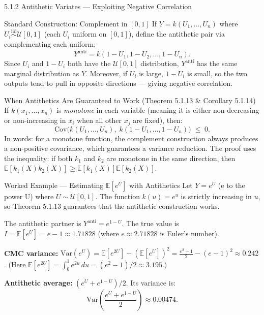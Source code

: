 \documentclass[aspectratio=169,10pt]{beamer}
\begin{document}
\begin{frame}[allowframebreaks]{5.1.2 Antithetic Variates --- Exploiting Negative Correlation}
\begin{block}{Standard Construction: Complement in $[0,1]$}
  If $Y = k(U_1, \ldots, U_n)$ where $U_i \overset{\mathrm{iid}}{\sim} \mathcal{U}[0,1]$
  (each $U_i$ uniform on $[0,1]$), define the antithetic pair via complementing
  each uniform:
  \[
    Y^{\mathrm{anti}} = k(1-U_1, 1-U_2, \ldots, 1-U_n).
  \]
  Since $U_i$ and $1-U_i$ both have the $\mathcal{U}[0,1]$ distribution,
  $Y^{\mathrm{anti}}$ has the same marginal distribution as $Y$.
  Moreover, if $U_i$ is large, $1-U_i$ is small, so the two outputs
  tend to pull in opposite directions --- giving negative correlation.
\end{block}

\framebreak

\begin{block}{When Antithetics Are Guaranteed to Work (Theorem 5.1.13 \& Corollary 5.1.14)}
  If $k(x_1, \ldots, x_n)$ is \emph{monotone} in each variable (meaning it is
  either non-decreasing or non-increasing in $x_i$ when all other $x_j$ are
  fixed), then:
  \[
    \mathrm{Cov}\bigl(k(U_1,\ldots,U_n),\; k(1-U_1,\ldots,1-U_n)\bigr) \;\le\; 0.
  \]
  In words: for a monotone function, the complement construction always
  produces a non-positive covariance, which guarantees a variance reduction.
  The proof uses the inequality: if both $k_1$ and $k_2$ are monotone in the
  same direction, then $\mathbb{E}[k_1(X)k_2(X)] \ge \mathbb{E}[k_1(X)]\mathbb{E}[k_2(X)]$.
\end{block}

\framebreak

\begin{exampleblock}{Worked Example --- Estimating $\mathbb{E}[e^U]$ with Antithetics}
  Let $Y = e^U$ (e to the power U) where $U \sim \mathcal{U}[0,1]$.
  The function $k(u) = e^u$ is strictly increasing in $u$, so Theorem 5.1.13
  guarantees that the antithetic construction works.

  The antithetic partner is $Y^{\mathrm{anti}} = e^{1-U}$.
  The true value is $I = \mathbb{E}[e^U] = e - 1 \approx 1.71828$
  (where $e \approx 2.71828$ is Euler's number).

  \medskip
  \textbf{CMC variance:}
  $\mathrm{Var}(e^U) = \mathbb{E}[e^{2U}] - (\mathbb{E}[e^U])^2
  = \tfrac{e^2-1}{2} - (e-1)^2 \approx 0.242$.
  (Here $\mathbb{E}[e^{2U}] = \int_0^1 e^{2u}\,du = (e^2-1)/2 \approx 3.195$.)

  \medskip
  \textbf{Antithetic average:} $(e^U + e^{1-U})/2$.
  Its variance is:
  \[
    \mathrm{Var}\!\left(\frac{e^U + e^{1-U}}{2}\right) \approx 0.00474.
  \]


\end{exampleblock}
\end{frame}
\end{document}

